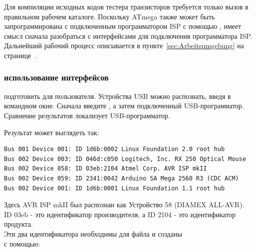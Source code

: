 Для компиляции исходных кодов тестера транзисторов требуется только вызов 
в правильном рабочем каталоге.
Поскольку ATmega также может быть запрограммирована с подключенным
программатором ISP с помощью ,
имеет смысл сначала разобраться с интерфейсами для подключения программатора ISP.
Дальнейший рабочий процесс описывается в пункте~\ref{sec:Arbeitsumgebung} на
странице~\pageref{sec:Arbeitsumgebung}. 


\subsubsection{использование интерфейсов}
подготовить для пользователя.
Устройства USB можно распознать, введя  в командном окне.
Сначала введите , а затем подключенный USB-программатор. \\
Сравнение результатов локализует USB-программатор.

Результат  может выглядеть так:
\begin{footnotesize} \begin{verbatim}
Bus 001 Device 001: ID 1d6b:0002 Linux Foundation 2.0 root hub
Bus 002 Device 003: ID 046d:c050 Logitech, Inc. RX 250 Optical Mouse
Bus 002 Device 058: ID 03eb:2104 Atmel Corp. AVR ISP mkII
Bus 002 Device 059: ID 2341:0042 Arduino SA Mega 2560 R3 (CDC ACM)
Bus 002 Device 001: ID 1d6b:0001 Linux Foundation 1.1 root hub
\end{verbatim} \end{footnotesize}
Здесь AVR ISP mkII был распознан как Устройство 58 (DIAMEX ALL-AVR). \\
ID 03eb - это идентификатор производителя, а ID 2104 - это идентификатор продукта. \\
Эти два идентификатора необходимы для файла  и созданы \\
с помощью:

